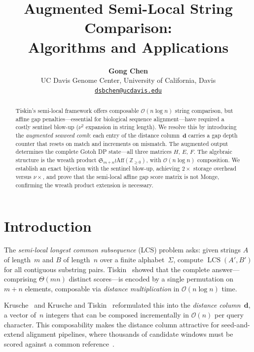 \documentclass[11pt, a4paper]{article}
\title{\vspace{-2em}\color{OxfordBlue}\textbf{Augmented Semi-Local String Comparison:\\Algorithms and Applications}}
\author{\textbf{Gong Chen} \\
\normalsize UC Davis Genome Center, University of California, Davis\\
\normalsize \href{mailto:dsbchen@ucdavis.edu}{\texttt{dsbchen@ucdavis.edu}}}
\date{\vspace{-2em}}
\theoremstyle{definition}
\theoremstyle{remark}
\newcommand{\LCS}{\operatorname{LCS}}
\newcommand{\dcol}{\mathbf{d}}
\newcommand{\bigO}{\mathcal{O}}
\begin{document}
\maketitle

\begin{abstract}
Tiskin's semi-local framework offers composable $\bigO(n \log n)$ string comparison, but affine gap penalties---essential for biological sequence alignment---have required a costly sentinel blow-up ($\nu^2$ expansion in string length).
We resolve this by introducing the \emph{augmented seaweed comb}: each entry of the distance column~$\dcol$ carries a gap depth counter that resets on match and increments on mismatch.
The augmented output determines the complete Gotoh DP state---all three matrices $H$, $E$, $F$.
The algebraic structure is the wreath product $\mathfrak{S}_{m+n} \wr \mathrm{Aff}(\mathbb{Z}_{\geq 0})$, with $\bigO(n \log n)$ composition.
We establish an exact bijection with the sentinel blow-up, achieving $2\times$ storage overhead versus $\nu\times$, and prove that the semi-local affine gap score matrix is not Monge, confirming the wreath product extension is necessary.
\end{abstract}

\section{Introduction}\label{sec:intro}

The \emph{semi-local longest common subsequence} (LCS) problem asks: given strings $A$ of length~$m$ and $B$ of length~$n$ over a finite alphabet~$\Sigma$, compute $\LCS(A', B')$ for all contiguous substring pairs.
Tiskin~\cite{tiskin2006semi,tiskin2008semi} showed that the complete answer---comprising $\Theta(mn)$ distinct scores---is encoded by a single permutation on $m{+}n$ elements, composable via \emph{distance multiplication} in $\bigO(n \log n)$ time.

Krusche~\cite{krusche2010spaa} and Krusche and Tiskin~\cite{krusche2009plots} reformulated this into the \emph{distance column}~$\dcol$, a vector of~$n$ integers that can be composed incrementally in $\bigO(n)$ per query character.
This composability makes the distance column attractive for seed-and-extend alignment pipelines, where thousands of candidate windows must be scored against a common reference~\cite{tiskin2008semi}.
\end{document}
